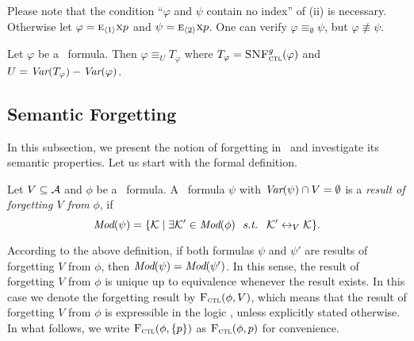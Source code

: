 \documentclass[twoside,11pt]{article}
\begin{document}
Please note that the condition  ``$\varphi$ and $\psi$ contain no index'' of (ii) is necessary. Otherwise let $\varphi=\textsc{e}_{{\langle{1}\rangle}}\textsc{x} p $ and
$\psi=\textsc{e}_{{\langle{2}\rangle}}\textsc{x} p $. One can verify $\varphi\equiv_\emptyset \psi$, but $\varphi\not\equiv\psi$.



\begin{proposition}\label{prop:transform:V:EQ}
  Let $\varphi$ be a \CTL\ formula. Then $\varphi\equiv_UT_\varphi$ where $T_\varphi={\textsc{SNF}_{\textsc{ctl}}^g}(\varphi)$ and
  $U=\textit{Var}(T_\varphi)-\textit{Var}(\varphi)$.
\end{proposition}

\subsection{Semantic Forgetting}
In this subsection, we present the notion of forgetting in \CTL\ and investigate its semantic properties. Let us start with the formal definition.
\begin{definition}\label{def:V:forgetting}
	Let $V\subseteq\cal A$ and $\phi$ be a \CTL\ formula.
	A \CTL\ formula $\psi$ with $\textit{Var}(\psi)\cap V=\emptyset$
	is a {\em result of forgetting $V$ from} $\phi$, if
	\begin{equation*}
		\textit{Mod}(\psi)=\{{\cal K} \mid \exists {\cal K}'\in\textit{Mod}(\phi)\ \text{ {\it s.t. }}\ {\cal K}'\leftrightarrow_V{\cal K}\}.
	\end{equation*}
\end{definition}


According to the above definition,  if both formulas $\psi$ and $\psi'$ are results of forgetting $V$ from $\phi$, then
$\textit{Mod}(\psi)=\textit{Mod}(\psi')$. In this sense, the result of  forgetting $V$ from $\phi$ is unique up to equivalence whenever the result exists.
In this case we denote the forgetting result by ${\textsc{F}_{\textsc{ctl}}}(\phi,V)$, which means that the result of forgetting $V$ from $\phi$
is expressible in the logic \CTL, unless explicitly stated otherwise.
In what follows, %
we write ${\textsc{F}_{\textsc{ctl}}}(\phi,\{p\})$ as ${\textsc{F}_{\textsc{ctl}}}(\phi,p)$ for convenience.
\end{document}
